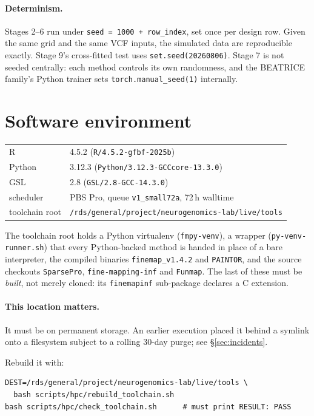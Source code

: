 \documentclass[11pt,a4paper]{article}
\newcommand{\file}[1]{\texttt{\small #1}}
\begin{document}
\paragraph{Determinism.} Stages 2--6 run under \texttt{seed = 1000 + row\_index},
set once per design row. Given the same grid and the same VCF inputs, the
simulated data are reproducible exactly. Stage 9's cross-fitted test uses
\texttt{set.seed(20260806)}. Stage 7 is not seeded centrally: each method
controls its own randomness, and the BEATRICE family's Python trainer sets
\texttt{torch.manual\_seed(1)} internally.

\section{Software environment}

\begin{center}\small
\begin{tabular}{ll}\toprule
R & 4.5.2 (\texttt{R/4.5.2-gfbf-2025b})\\
Python & 3.12.3 (\texttt{Python/3.12.3-GCCcore-13.3.0})\\
GSL & 2.8 (\texttt{GSL/2.8-GCC-14.3.0})\\
scheduler & PBS Pro, queue \texttt{v1\_small72a}, 72\,h walltime\\
toolchain root & \file{/rds/general/project/neurogenomics-lab/live/tools}\\
\bottomrule\end{tabular}\end{center}

The toolchain root holds a Python virtualenv (\file{fmpy-venv}), a wrapper
(\file{py-venv-runner.sh}) that every Python-backed method is handed in place of
a bare interpreter, the compiled binaries \file{finemap\_v1.4.2} and
\file{PAINTOR}, and the source checkouts \file{SparsePro}, \file{fine-mapping-inf}
and \file{Funmap}. The last of these must be \emph{built}, not merely cloned: its
\file{finemapinf} sub-package declares a C extension.

\paragraph{This location matters.} It must be on permanent storage. An earlier
execution placed it behind a symlink onto a filesystem subject to a rolling
30-day purge; see \S\ref{sec:incidents}.

Rebuild it with:
\begin{Verbatim}[fontsize=\small,frame=single]
DEST=/rds/general/project/neurogenomics-lab/live/tools \
  bash scripts/hpc/rebuild_toolchain.sh
bash scripts/hpc/check_toolchain.sh      # must print RESULT: PASS
\end{Verbatim}
\end{document}
